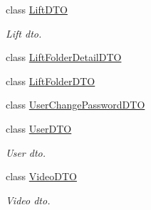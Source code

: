 \begin{DoxyCompactItemize}
class \mbox{\hyperlink{class_bar_none_1_1_shared_1_1_data_transfer_1_1_lift_d_t_o}{Lift\+D\+TO}}
\begin{DoxyCompactList}\small\item\em Lift dto. \end{DoxyCompactList}\item 
class \mbox{\hyperlink{class_bar_none_1_1_shared_1_1_data_transfer_1_1_lift_folder_detail_d_t_o}{Lift\+Folder\+Detail\+D\+TO}}
\item 
class \mbox{\hyperlink{class_bar_none_1_1_shared_1_1_data_transfer_1_1_lift_folder_d_t_o}{Lift\+Folder\+D\+TO}}
\item 
class \mbox{\hyperlink{class_bar_none_1_1_shared_1_1_data_transfer_1_1_user_change_password_d_t_o}{User\+Change\+Password\+D\+TO}}
\item 
class \mbox{\hyperlink{class_bar_none_1_1_shared_1_1_data_transfer_1_1_user_d_t_o}{User\+D\+TO}}
\begin{DoxyCompactList}\small\item\em User dto. \end{DoxyCompactList}\item 
class \mbox{\hyperlink{class_bar_none_1_1_shared_1_1_data_transfer_1_1_video_d_t_o}{Video\+D\+TO}}
\begin{DoxyCompactList}\small\item\em Video dto. \end{DoxyCompactList}\end{DoxyCompactItemize}
